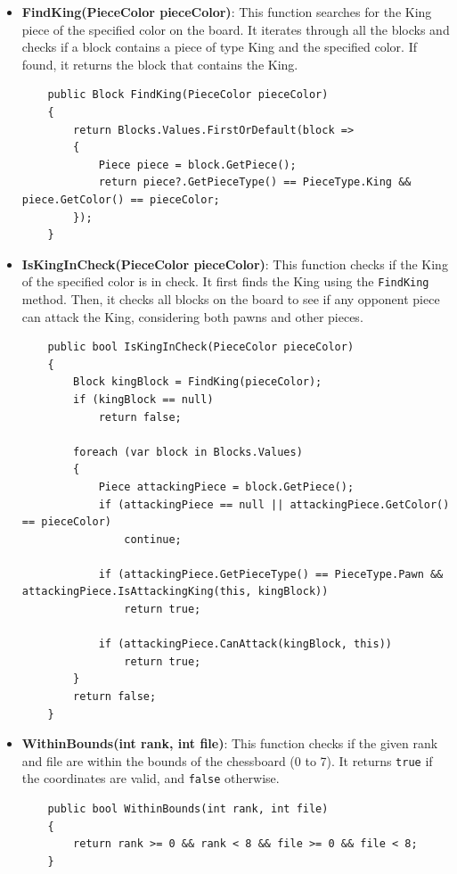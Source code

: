 \documentclass[a4paper,12pt]{article}
\begin{document}
\begin{itemize}
    \item \textbf{FindKing(PieceColor pieceColor)}: 
    This function searches for the King piece of the specified color on the board. It iterates through all the blocks and checks if a block contains a piece of type King and the specified color. If found, it returns the block that contains the King.

    \begin{verbatim}
    public Block FindKing(PieceColor pieceColor)
    {
        return Blocks.Values.FirstOrDefault(block =>
        {
            Piece piece = block.GetPiece();
            return piece?.GetPieceType() == PieceType.King && piece.GetColor() == pieceColor;
        });
    }
    \end{verbatim}

    \item \textbf{IsKingInCheck(PieceColor pieceColor)}:
    This function checks if the King of the specified color is in check. It first finds the King using the \texttt{FindKing} method. Then, it checks all blocks on the board to see if any opponent piece can attack the King, considering both pawns and other pieces.

    \begin{verbatim}
    public bool IsKingInCheck(PieceColor pieceColor)
    {
        Block kingBlock = FindKing(pieceColor);
        if (kingBlock == null)
            return false;

        foreach (var block in Blocks.Values)
        {
            Piece attackingPiece = block.GetPiece();
            if (attackingPiece == null || attackingPiece.GetColor() == pieceColor)
                continue;

            if (attackingPiece.GetPieceType() == PieceType.Pawn && attackingPiece.IsAttackingKing(this, kingBlock))
                return true;

            if (attackingPiece.CanAttack(kingBlock, this))
                return true;
        }
        return false;
    }
    \end{verbatim}

    \item \textbf{WithinBounds(int rank, int file)}:
    This function checks if the given rank and file are within the bounds of the chessboard (0 to 7). It returns \texttt{true} if the coordinates are valid, and \texttt{false} otherwise.

    \begin{verbatim}
    public bool WithinBounds(int rank, int file)
    {
        return rank >= 0 && rank < 8 && file >= 0 && file < 8;
    }
    \end{verbatim}


\end{itemize}
\end{document}
